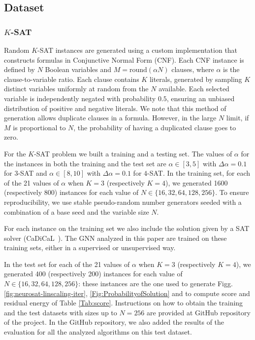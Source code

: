 \documentclass{article}
\begin{document}
\subsection{Dataset}

\subsubsection{$K$-SAT}
Random $K$-SAT instances are generated using a custom implementation that constructs formulas in Conjunctive Normal Form (CNF). Each CNF instance is defined by $N$ Boolean variables and $M = \mathrm{round}(\alpha N)$ clauses, where $\alpha$ is the clause-to-variable ratio. Each clause contains $K$ literals, generated by sampling $K$ distinct variables uniformly at random from the $N$ available. Each selected variable is independently negated with probability $0.5$, ensuring an unbiased distribution of positive and negative literals.
We note that this method of generation allows duplicate clauses in a formula. However, in the large $N$ limit, if $M$ is proportional to $N$, the probability of having a duplicated clause goes to zero.

For the $K$-SAT problem we built a training and a testing set.
The values of $\alpha$ for the instances in both the training and the test set are $\alpha \in [3,5]$ with $\Delta \alpha=0.1$ for $3$-SAT and $\alpha \in [8,10]$ with $\Delta \alpha=0.1$  for $4$-SAT.
In the training set, for each of the 21 values of $\alpha$ when $K=3$ (respectively $K=4$), we generated 1600 (respectively 800) instances for each value of $N \in \{16, 32, 64, 128, 256\}$. 
To ensure reproducibility, we use stable pseudo-random number generators seeded with a combination of a base seed and the variable size $N$.

For each instance on the training set we also include the solution given by a SAT solver (CaDiCaL~\cite{BiereFallerFazekasFleuryFroleyksCADICAL4}).
The GNN analyzed in this paper are trained on these training sets, either in a supervised or unsupervised way.

In the test set for each of the 21 values of $\alpha$ when $K=3$ (respectively $K=4$), we generated 400 (respectively 200) instances for each value of $N \in \{16, 32, 64, 128, 256\}$: these instances are the one used to generate Figg. \ref{fig:neurosat-linscaling-iter}, \ref{Fig:ProbabilityofSolution} and to compute score and residual energy of Table \ref{Tab:score}. Instructions on how to obtain the training and the test datasets with sizes up to $N=256$ are provided at GitHub repository of the project. In the GitHub repository, we also added the results of the evaluation for all the analyzed algorithms on this test dataset.
\end{document}
